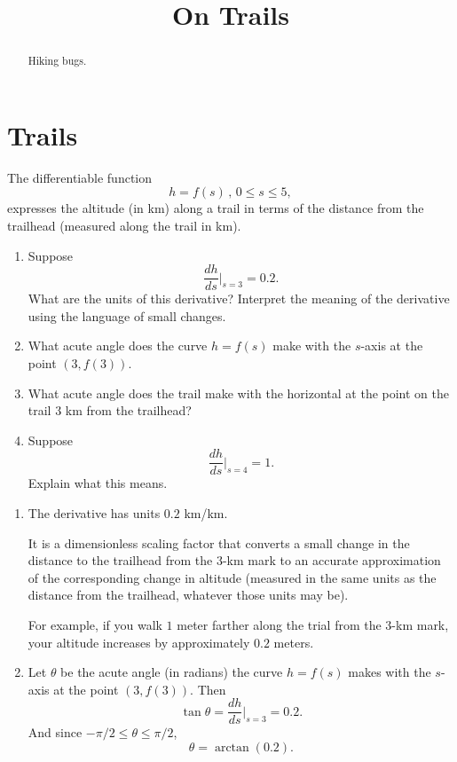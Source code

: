 \documentclass{ximera}
\title{On Trails}
\begin{document}
\begin{abstract}
Hiking bugs.
\end{abstract}
\maketitle


\section{Trails}

\begin{question} \label{Qler3r3rfd}
The differentiable function
\[
   h = f(s) \, , \, 0\leq s \leq 5,
\]
expresses the altitude (in km) along a trail in terms of the distance from the trailhead (measured along the trail in km).

\begin{enumerate}
\item Suppose
\[
    \frac{dh}{ds}\Big|_{s=3} = 0.2 .
\]
What are the units of this derivative? Interpret the meaning of the derivative using the language of small changes.

\item What acute angle does the curve $h=f(s)$ make with the $s$-axis at the point $(3, f(3))$.

\item What acute angle does the trail make with the horizontal at the point on the trail $3$ km from the trailhead? 

\item  Suppose
\[
    \frac{dh}{ds}\Big|_{s=4} = 1 .
\]
Explain what this means.
\end{enumerate}

\begin{explanation}
\begin{enumerate}
\item The derivative has units $0.2$ km/km. 

It is a dimensionless scaling factor that converts a small change in the distance to the trailhead from the $3$-km mark to an accurate approximation of the corresponding change in altitude (measured in the same units as the distance from the trailhead, whatever those units may be).

For example, if you walk $1$ meter farther along the trial from the $3$-km mark, your altitude increases by approximately $0.2$ meters.

\item Let $\theta$ be the acute angle (in radians) the curve $h=f(s)$ makes with the $s$-axis at the point $(3, f(3))$. Then 
\[
  \tan \theta = \frac{dh}{ds}\Big|_{s=3} = 0.2 .
\]
And since $-\pi/2 \leq \theta \leq \pi/2$,
\[
 \theta = \arctan(0.2).
\]


\end{enumerate}
\end{explanation}
\end{question}
\end{document}
